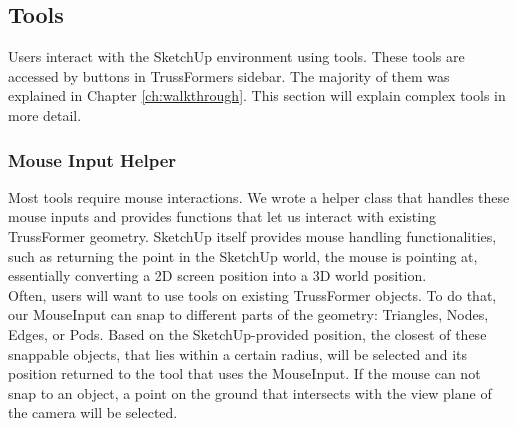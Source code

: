 \subsection{Tools}
Users interact with the SketchUp environment using tools. These tools are accessed by buttons in TrussFormers sidebar. The majority of them was explained in Chapter \ref{ch:walkthrough}. This section will explain complex tools in more detail.

\subsubsection{Mouse Input Helper}
Most tools require mouse interactions. We wrote a helper class that handles these mouse inputs and provides functions that let us interact with existing TrussFormer geometry. SketchUp itself provides mouse handling functionalities, such as returning the point in the SketchUp world, the mouse is pointing at, essentially converting a 2D screen position into a 3D world position.\\
Often, users will want to use tools on existing TrussFormer objects. To do that, our MouseInput can snap to different parts of the geometry: Triangles, Nodes, Edges, or Pods. Based on the SketchUp-provided position, the closest of these snappable objects, that lies within a certain radius, will be selected and its position returned to the tool that uses the MouseInput. If the mouse can not snap to an object, a point on the ground that intersects with the view plane of the camera will be selected.

